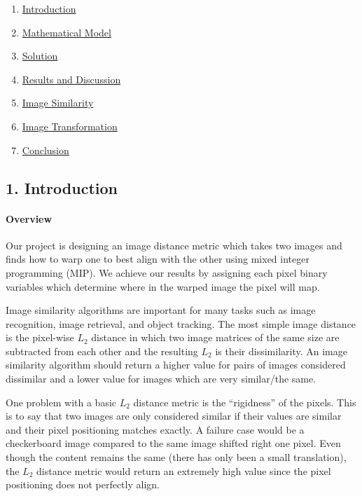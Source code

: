 \documentclass[11pt]{article}
\providecommand{\tightlist}{%
      \setlength{\itemsep}{0pt}\setlength{\parskip}{0pt}}
\begin{document}
\begin{enumerate}
\def\labelenumi{\arabic{enumi}.}
\tightlist
\item
  \hyperref[1-introduction]{Introduction}
\item
  \hyperref[2-mathematical-model]{Mathematical Model}
\item
  \hyperref[3-solution]{Solution}
\item
  \hyperref[4-results-and-discussion]{Results and Discussion}
\item
  \hyperref[4a-image-similarity]{Image Similarity}
\item
  \hyperref[4b-image-transformation]{Image Transformation}
\item
  \hyperref[5-conclusion]{Conclusion}
\end{enumerate}

    \hypertarget{introduction}{%
\subsection{1. Introduction}\label{introduction}}

\hypertarget{overview}{%
\paragraph{Overview}\label{overview}}

Our project is designing an image distance metric which takes two images
and finds how to warp one to best align with the other using mixed
integer programming (MIP). We achieve our results by assigning each
pixel binary variables which determine where in the warped image the
pixel will map.

Image similarity algorithms are important for many tasks such as image
recognition, image retrieval, and object tracking. The most simple image
distance is the pixel-wise \(L_2\) distance in which two image matrices
of the same size are subtracted from each other and the resulting
\(L_2\) is their dissimilarity. An image similarity algorithm should
return a higher value for pairs of images considered dissimilar and a
lower value for images which are very similar/the same.

One problem with a basic \(L_2\) distance metric is the ``rigidness'' of
the pixels. This is to say that two images are only considered similar
if their values are similar and their pixel positioning matches exactly.
A failure case would be a checkerboard image compared to the same image
shifted right one pixel. Even though the content remains the same (there
has only been a small translation), the \(L_2\) distance metric would
return an extremely high value since the pixel positioning does not
perfectly align.
\end{document}
